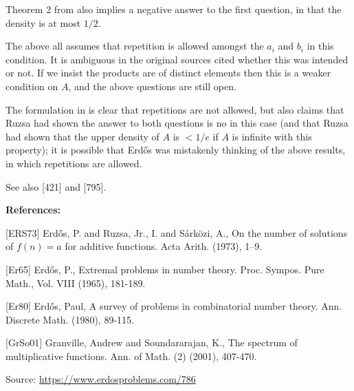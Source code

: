 \documentclass{article}
\begin{document}
Theorem 2 from \cite{ERS73} also implies a negative answer to the first question, in that the density is at most $1/2$.

The above all assumes that repetition is allowed amongst the $a_i$ and $b_i$ in this condition. It is ambiguous in the original sources cited whether this was intended or not. If we insist the products are of distinct elements then this is a weaker condition on $A$, and the above questions are still open.

The formulation in \cite{Er80} is clear that repetitions are not allowed, but also claims that Ruzsa had shown the answer to both questions is no in this case (and that Ruzsa had shown that the upper density of $A$ is $<1/e$ if $A$ is infinite with this property); it is possible that Erd\H{o}s was mistakenly thinking of the above results, in which repetitions are allowed.

See also [421] and [795].

\bigskip
\noindent\textbf{References:}

[ERS73] Erd\H{o}s, P. and Ruzsa, Jr., I. and S\'{a}rk\"ozi, A., On the number of solutions of {$f(n)=a$} for additive functions. Acta Arith. (1973), 1--9.
 
 [Er65] Erd\H{o}s, P., Extremal problems in number theory. Proc. Sympos. Pure Math., Vol. VIII (1965), 181-189.
 
 [Er80] Erd\H{o}s, Paul, A survey of problems in combinatorial number theory. Ann. Discrete Math. (1980), 89-115.
 
 [GrSo01] Granville, Andrew and Soundararajan, K., The spectrum of multiplicative functions. Ann. of Math. (2) (2001), 407-470.

\bigskip
\noindent\small{Source: \url{https://www.erdosproblems.com/786}}
\end{document}
